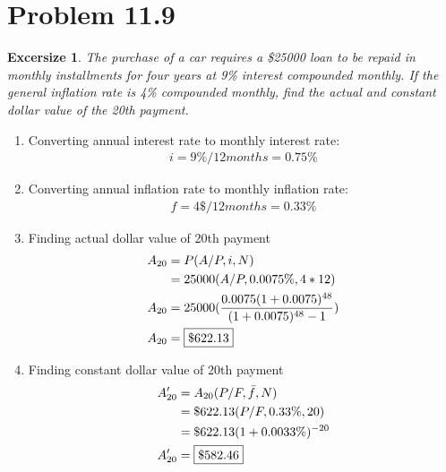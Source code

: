 \documentclass[../INDE250HW.tex]{subfiles}
\newtheorem{exrc}{Excersize}
\begin{document}
\newpage
\section*{Problem 11.9}
\begin{exrc}
    The purchase of a car requires a \$25000 loan to be repaid in monthly installments for four years at 9\% interest compounded monthly. If the general inflation rate is 4\% compounded monthly, find the actual and constant dollar value of the 20th payment.
\end{exrc}
\begin{enumerate}
    \item Converting annual interest rate to monthly interest rate:
        \begin{equation*}
            \begin{aligned}
                i = 9\%/12months = 0.75\%
            \end{aligned}
        \end{equation*}
    \item Converting annual inflation rate to monthly inflation rate:
        \begin{equation*}
            \begin{aligned}
                f = 4\$/12months = 0.33\%
            \end{aligned}
        \end{equation*}
    \item Finding actual dollar value of 20th payment %
        \begin{equation*}
            \begin{aligned}
                A_{20} &= P(A/P,i,N) \\
                        &= 25000(A/P, 0.0075\%,4*12) \\
                A_{20} &= 25000(\frac{0.0075(1+0.0075)^{48}}{(1+0.0075)^{48}-1}) \\
                A_{20} &= \framebox{$\$622.13$}
            \end{aligned}
        \end{equation*}
    \item Finding constant dollar value of 20th payment %
        \begin{equation*}
            \begin{aligned}
                A'_{20} &= A_{20}(P/F,\bar{f},N) \\
                        &= \$622.13(P/F,0.33\%,20) \\
                        &= \$622.13(1 + 0.0033\%)^{-20}\\
                A'_{20} &= \framebox{$\$582.46$}
            \end{aligned}
        \end{equation*}
\end{enumerate}
\end{document}
